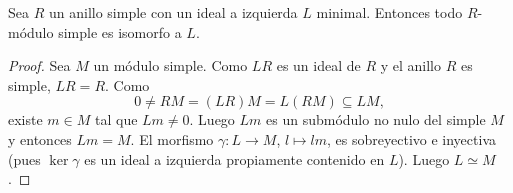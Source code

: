 %

\begin{lemma}
	\label{lem:simple_izqminimal}
	Sea $R$ un anillo simple con un ideal a izquierda $L$ minimal. Entonces
	todo $R$-módulo simple es isomorfo a $L$. 
\end{lemma}

\begin{proof}
	Sea $M$ un módulo simple. Como $LR$ es un ideal de $R$ y el anillo $R$ es
	simple, $LR=R$.  Como
	\[
		0\ne RM=(LR)M=L(RM)\subseteq LM,
	\]
	existe $m\in M$ tal que $Lm\ne 0$. Luego $Lm$ es un submódulo no nulo del simple $M$ y entonces
	$Lm=M$. El morfismo $\gamma\colon L\to M$, $l\mapsto lm$, es sobreyectivo e
	inyectiva (pues $\ker\gamma$ es un ideal a izquierda propiamente
	contenido en $L$). Luego $L\simeq M$. 
\end{proof}

